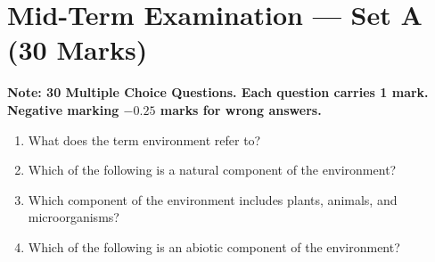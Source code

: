 \section{Mid-Term Examination --- Set A (30 Marks)}
\label{sec:midterm_set_a}


\begin{center}
\sffamily\textbf{\color{AlertRed}Note: 30 Multiple Choice Questions. Each question carries 1 mark. Negative marking $-0.25$ marks for wrong answers.}
\end{center}

\begin{enumerate}[label=\textbf{\arabic*.}]
    \item {What does the term environment refer to?}
    \item {Which of the following is a natural component of the environment?}
    \item {Which component of the environment includes plants, animals, and microorganisms?}
    \item {Which of the following is an abiotic component of the environment?}

\end{enumerate}
